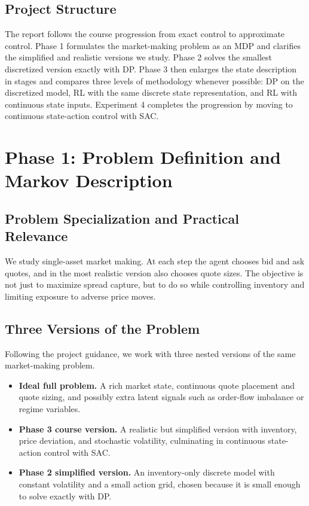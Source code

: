 \documentclass[11pt,a4paper]{article}
\begin{document}
\subsection{Project Structure}

The report follows the course progression from exact control to approximate control. Phase 1 formulates the market-making problem as an MDP and clarifies the simplified and realistic versions we study. Phase 2 solves the smallest discretized version exactly with DP. Phase 3 then enlarges the state description in stages and compares three levels of methodology whenever possible: DP on the discretized model, RL with the same discrete state representation, and RL with continuous state inputs. Experiment 4 completes the progression by moving to continuous state-action control with SAC.

\section{Phase 1: Problem Definition and Markov Description}

\subsection{Problem Specialization and Practical Relevance}

We study single-asset market making. At each step the agent chooses bid and ask quotes, and in the most realistic version also chooses quote sizes. The objective is not just to maximize spread capture, but to do so while controlling inventory and limiting exposure to adverse price moves. 

\subsection{Three Versions of the Problem}

Following the project guidance, we work with three nested versions of the same market-making problem.

\begin{itemize}
    \item \textbf{Ideal full problem.} A rich market state, continuous quote placement and quote sizing, and possibly extra latent signals such as order-flow imbalance or regime variables.
    \item \textbf{Phase 3 course version.} A realistic but simplified version with inventory, price deviation, and stochastic volatility, culminating in continuous state-action control with SAC.
    \item \textbf{Phase 2 simplified version.} An inventory-only discrete model with constant volatility and a small action grid, chosen because it is small enough to solve exactly with DP.
\end{itemize}
\end{document}
